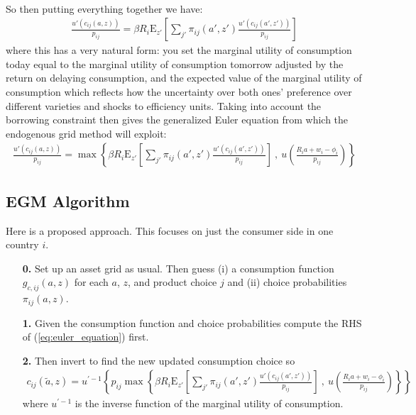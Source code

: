 \documentclass[12pt,pdftex]{article}
\begin{document}
\begin{onehalfspacing}
\begin{align}
\end{align}
So then putting everything together we have:
\begin{align}
\frac{u'(c_{ij}(a, z))}{p_{ij}} = \beta R_{i} \mathrm{E}_{z'} \left[ \sum_{j'} \pi_{ij}(a', z') \frac{u'(c_{ij}(a', z'))}{p_{ij}} \right]
\end{align}
where this has a very natural form: you set the marginal utility of consumption today equal to the marginal utility of consumption tomorrow adjusted by the return on delaying consumption, and the expected value of the marginal utility of consumption which reflects how the uncertainty over both ones' preference over different varieties and shocks to efficiency units. Taking into account the borrowing constraint then gives the generalized Euler equation from which the endogenous grid method will exploit:
\begin{align}
\frac{u'(c_{ij}(a, z))}{p_{ij}} = \max \left\{ \beta R_{i} \mathrm{E}_{z'} \left[ \sum_{j'} \pi_{ij}(a', z') \frac{u'(c_{ij}(a', z'))}{p_{ij}} \right] \ , \  u \left( \frac{R_i a + w_i - \phi_{i}}{p_{ij}} \right) \right \}
\label{eq:euler_equation}
\end{align}

\subsection{EGM Algorithm}

Here is a proposed approach. This focuses on just the consumer side in one country $i$.
\begin{itemize}
\item[\textbf{0.}] Set up an asset grid as usual. Then guess (i) a consumption function $g_{c,ij}(a,z)$ for each $a$, $z$, and product choice $j$ and (ii) choice probabilities $\pi_{ij}(a, z)$.

\item[\textbf{1.}] Given the consumption function and choice probabilities compute the RHS of (\ref{eq:euler_equation}) first.


\item[\textbf{2.}] Then invert to find the new updated consumption choice so
\begin{align}
c_{ij}(\tilde a, z) = u^{' -1}\left\{ p_{ij} \max \left\{ \beta R_{i} \mathrm{E}_{z'} \left[ \sum_{j'} \pi_{ij}(a', z') \frac{u'(c_{ij}(a', z'))}{p_{ij}} \right] \ , \  u \left( \frac{R_i a + w_i - \phi_{i}}{p_{ij}} \right) \right \} \right \}
\end{align}
where $u^{' -1}$ is the inverse function of the marginal utility of consumption.


\end{itemize}
\end{onehalfspacing}
\end{document}
